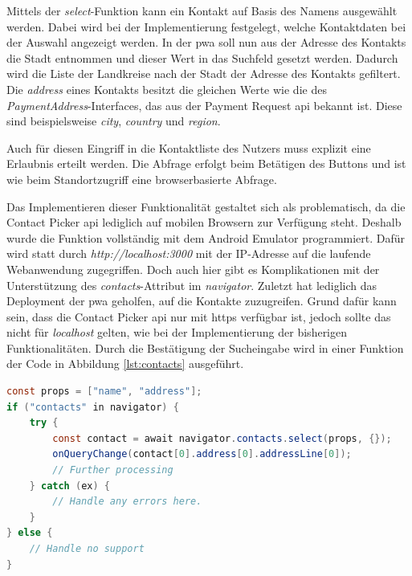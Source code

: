Mittels der \textit{select}-Funktion kann ein Kontakt auf Basis des Namens ausgewählt werden.
Dabei wird bei der Implementierung festgelegt, welche Kontaktdaten bei der Auswahl angezeigt werden.
In der \ac{pwa} soll nun aus der Adresse des Kontakts die Stadt entnommen und dieser Wert in das Suchfeld gesetzt werden.
Dadurch wird die Liste der Landkreise nach der Stadt der Adresse des Kontakts gefiltert.
Die \textit{address} eines Kontakts besitzt die gleichen Werte wie die des \textit{PaymentAddress}-Interfaces, das aus der Payment Request \ac{api} bekannt ist.
Diese sind beispielsweise \textit{city}, \textit{country} und \textit{region}.

Auch für diesen Eingriff in die Kontaktliste des Nutzers muss explizit eine Erlaubnis erteilt werden.
Die Abfrage erfolgt beim Betätigen des Buttons und ist wie beim Standortzugriff eine browserbasierte Abfrage.

Das Implementieren dieser Funktionalität gestaltet sich als problematisch, da die Contact Picker \ac{api} lediglich auf mobilen Browsern zur Verfügung steht.
Deshalb wurde die Funktion vollständig mit dem Android Emulator programmiert.
Dafür wird statt durch \textit{http://localhost:3000} mit der IP-Adresse auf die laufende Webanwendung zugegriffen.
Doch auch hier gibt es Komplikationen mit der Unterstützung des \textit{contacts}-Attribut im \textit{navigator}.
Zuletzt hat lediglich das Deployment der \ac{pwa} geholfen, auf die Kontakte zuzugreifen.
Grund dafür kann sein, dass die Contact Picker \ac{api} nur mit \ac{https} verfügbar ist, jedoch sollte das nicht für \textit{localhost} gelten, wie bei der Implementierung der bisherigen Funktionalitäten.
Durch die Bestätigung der Sucheingabe wird in einer Funktion der Code in Abbildung \ref{lst:contacts} ausgeführt.

\begin{lstlisting}[language=Java,caption={Zugriff auf Kontakte},captionpos=b,label={lst:contacts}]
const props = ["name", "address"];
if ("contacts" in navigator) {
	try {
		const contact = await navigator.contacts.select(props, {});
        onQueryChange(contact[0].address[0].addressLine[0]);
		// Further processing
	} catch (ex) {
		// Handle any errors here.
	}
} else {
	// Handle no support
}
\end{lstlisting}

